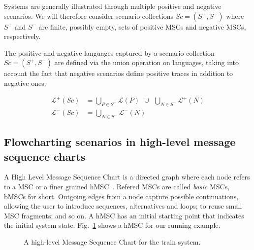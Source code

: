 Systems are generally illustrated through multiple positive and negative scenarios. We will therefore consider scenario collections $Sc = (S^+,S^-)$ where $S^+$ and $S^-$ are finite, possibly empty, sets of positive MSCs and negative MSCs, respectively.

The positive and negative languages captured by a scenario collection $Sc = (S^+,S^-)$ are defined via the union operation on languages, taking into account the fact that negative scenarios define positive traces in addition to negative ones:

\vspace{-0.5cm}
\begin{align}
\mathcal{L}^+(Sc) &= \bigcup_{P \in S^+} \mathcal{L}(P)~~\cup~~\bigcup_{N \in S^{-}} \mathcal{L}^{+}(N) \\
\mathcal{L}^-(Sc) &= \bigcup_{N \in S^-} \mathcal{L}^{-}(N)
\end{align}

\subsection{Flowcharting scenarios in high-level message sequence charts\label{subsection:background-hmsc}}

A High Level Message Sequence Chart is a directed graph where each node refers to a MSC or a finer grained hMSC~\cite{ITU:1996}. Refered MSCs are called \emph{basic} MSCs, bMSCs for short. Outgoing edges from a node capture possible continuations, allowing the user to introduce sequences, alternatives and loops; to reuse small MSC fragments; and so on. A hMSC has an initial starting point that indicates the initial system state. Fig.~\ref{image:train-hmsc} shows a hMSC for our running example.

\vspace{0.4cm}
\begin{figure}[H]\centering
{}
\caption{A high-level Message Sequence Chart for the train system.\label{image:train-hmsc}}
\end{figure}

